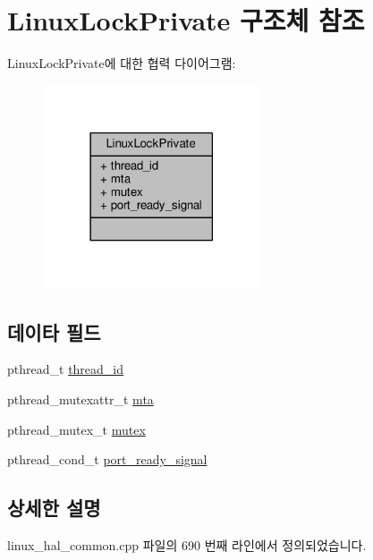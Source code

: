 \hypertarget{struct_linux_lock_private}{}\section{Linux\+Lock\+Private 구조체 참조}
\label{struct_linux_lock_private}


Linux\+Lock\+Private에 대한 협력 다이어그램\+:
\nopagebreak
\begin{figure}[H]
\begin{center}
\leavevmode
\includegraphics[width=182pt]{struct_linux_lock_private__coll__graph}
\end{center}
\end{figure}
\subsection*{데이타 필드}
\begin{DoxyCompactItemize}
\item 
pthread\+\_\+t \hyperlink{struct_linux_lock_private_a614409619094fd8c0c6b522c400ffeea}{thread\+\_\+id}
\item 
pthread\+\_\+mutexattr\+\_\+t \hyperlink{struct_linux_lock_private_a3b2e3466cff7f96f4489a59be85aed1f}{mta}
\item 
pthread\+\_\+mutex\+\_\+t \hyperlink{struct_linux_lock_private_a4acff8232e4aec9cd5c6dc200ac55ef3}{mutex}
\item 
pthread\+\_\+cond\+\_\+t \hyperlink{struct_linux_lock_private_a661b628f98aeac53e3761d30a8201add}{port\+\_\+ready\+\_\+signal}
\end{DoxyCompactItemize}


\subsection{상세한 설명}


linux\+\_\+hal\+\_\+common.\+cpp 파일의 690 번째 라인에서 정의되었습니다.



